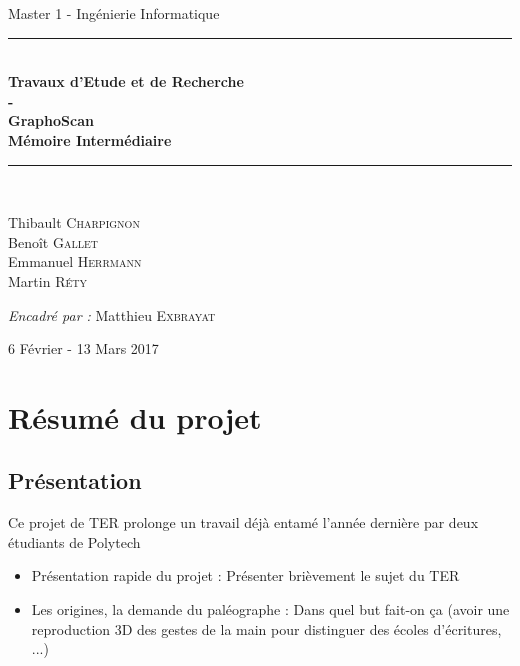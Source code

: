 \documentclass{article}
\begin{document}
\begin{center}
{\large Master 1 - Ingénierie Informatique} \\ [0.5cm]
\vfill
\rule{\linewidth}{0.4mm} \\ [0.4cm]
{\huge \bfseries
Travaux d'Etude et de Recherche\\
- \\
GraphoScan \\ [0.4cm]
Mémoire Intermédiaire \\ [0.4cm]
}
\rule{\linewidth}{0.4mm} \\ [1.5cm]

\begin{minipage}{0.4\textwidth}
\begin{flushleft} \large
Thibault \textsc{Charpignon} \\
Benoît \textsc{Gallet} \\
Emmanuel \textsc{Herrmann} \\
Martin \textsc{Réty}
\end{flushleft}
\end{minipage}

\vfill

\large\emph{Encadré par : }{Matthieu \textsc{Exbrayat}}

\vfill


{\large 6 Février - 13 Mars 2017}

\end{center}

\newpage
 
\tableofcontents

\newpage
 
\section{Résumé du projet}

\subsection{Présentation}

Ce projet de TER prolonge un travail déjà entamé l'année dernière par deux étudiants de Polytech

\begin{itemize}
\item Présentation rapide du projet : Présenter brièvement le sujet du TER
\item Les origines, la demande du paléographe : Dans quel but fait-on ça (avoir une reproduction 3D des gestes de la main pour distinguer des écoles d'écritures, ...)
\end{itemize}
\end{document}
